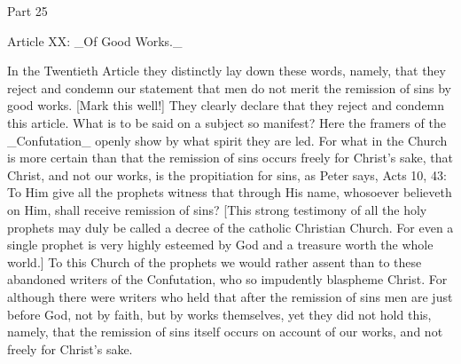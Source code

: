 Part 25


Article XX: _Of Good Works._

In the Twentieth Article they distinctly lay down these words, namely,
that they reject and condemn our statement that men do not merit the
remission of sins by good works.  [Mark this well!] They clearly
declare that they reject and condemn this article.  What is to be
said on a subject so manifest?  Here the framers of the _Confutation_
openly show by what spirit they are led.  For what in the Church is
more certain than that the remission of sins occurs freely for
Christ's sake, that Christ, and not our works, is the propitiation
for sins, as Peter says, Acts 10, 43: To Him give all the prophets
witness that through His name, whosoever believeth on Him, shall
receive remission of sins?  [This strong testimony of all the holy
prophets may duly be called a decree of the catholic Christian Church.
For even a single prophet is very highly esteemed by God and a
treasure worth the whole world.] To this Church of the prophets we
would rather assent than to these abandoned writers of the
Confutation, who so impudently blaspheme Christ.  For although there
were writers who held that after the remission of sins men are just
before God, not by faith, but by works themselves, yet they did not
hold this, namely, that the remission of sins itself occurs on
account of our works, and not freely for Christ's sake.

